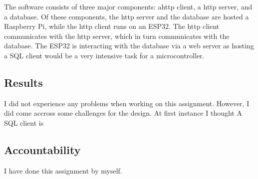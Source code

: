 The software consists of three major components: a\gls{http} client, a \gls{http} server, and a database. 
Of these components, the \gls{http} server and the database are hosted a Raspberry Pi, while the \gls{http} client runs on an ESP32.
The \gls{http} client communicates with the \gls{http} server, which in turn communicates with the database.
The ESP32 is interacting with the database via a web server as hosting a SQL client would be a very intensive task for a microcontroller.

\subsection{Results}

I did not experience any problems when working on this assignment.
However, I did come accross some challenges for the design.
At first instance I thought 
A SQL client is 

\subsection{Accountability}

I have done this assignment by myself.

\clearpage

